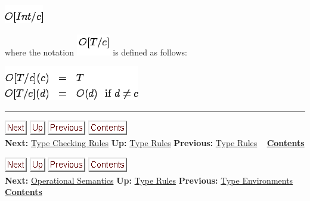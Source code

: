 \documentclass[]{article}
\begin{document}
\includegraphics{img66.png}

where the notation \includegraphics{img67.png} is defined as follows:

\includegraphics{img68.png}

\begin{center}\rule{3in}{0.4pt}\end{center}

\href{node43.html}{\includegraphics{next.png}}
\href{node41.html}{\includegraphics{up.png}}
\href{node41.html}{\includegraphics{prev.png}}
\href{node1.html}{\includegraphics{contents.png}} \\ \textbf{Next:}
\href{node43.html}{Type Checking Rules} \textbf{Up:}
\href{node41.html}{Type Rules} \textbf{Previous:}
\href{node41.html}{Type Rules} ~ \textbf{\href{node1.html}{Contents}}

\href{node44.html}{\includegraphics{next.png}}
\href{node41.html}{\includegraphics{up.png}}
\href{node42.html}{\includegraphics{prev.png}}
\href{node1.html}{\includegraphics{contents.png}} \\ \textbf{Next:}
\href{node44.html}{Operational Semantics} \textbf{Up:}
\href{node41.html}{Type Rules} \textbf{Previous:}
\href{node42.html}{Type Environments} ~
\textbf{\href{node1.html}{Contents}} \\ \\
\end{document}
